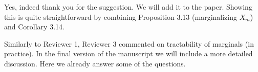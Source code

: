 \documentclass[letterpaper]{article} %
\newcommand{\spacing}{\vspace{0.1cm}}
\newcommand{\question}[1]{\noindent{\bf\color{teal}{#1}}}
\newcommand{\answer}[1]{\noindent{\normalfont\color{black}{#1}}}
\begin{document}

\spacing
\question{
Also, I think PNCs are tractable for more general ordered conditionals than shown in Corollary 3.14. [...].
}

Yes, indeed thank you for the suggestion. We will add it to the paper. Showing this is quite straightforward by combining Proposition 3.13 (marginalizing $X_m$) and Corollary 3.14. 

\spacing
\question{Minor Questions / Comments}

\answer{
Due to space constraints, we are, unfortunately, not able to comment on them here. We will address them in the camera-ready version of the manuscript.
}











\vspace{0.1cm}


\noindent
Similarly to Reviewer 1, Reviewer 3 commented on tractability of marginals (in practice). In the final version of the manuscript we will include a more detailed discussion. Here we already answer some of the questions.
\end{document}
